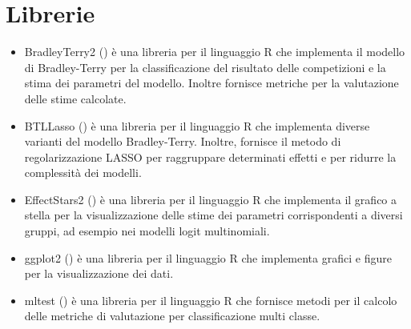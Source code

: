 \section{Librerie}\label{cap:importR}
\begin{itemize}
	\item\textsf{BradleyTerry2} (\textit{\cite{bt2}}) è una libreria per il linguaggio R che implementa il modello di Bradley-Terry per la classificazione del risultato delle competizioni e la stima dei parametri del modello. Inoltre fornisce metriche per la valutazione delle stime calcolate.
	\item\textsf{BTLLasso} (\textit{\cite{btl}}) è una libreria per il linguaggio R che implementa diverse varianti del modello Bradley-Terry. Inoltre, fornisce il metodo di regolarizzazione LASSO per raggruppare determinati effetti e per ridurre la complessità dei modelli.
	\item\textsf{EffectStars2} (\textit{\cite{EffectStars2}}) è una libreria per il linguaggio R che implementa il grafico a stella per la visualizzazione delle stime dei parametri corrispondenti a diversi gruppi, ad esempio nei modelli logit multinomiali.
	\item\textsf{ggplot2} (\textit{\cite{ggplot2}}) è una libreria per il linguaggio R che implementa grafici e figure per la visualizzazione dei dati.
	\item\textsf{mltest} (\textit{\cite{mltest}}) è una libreria per il linguaggio R che fornisce metodi per il calcolo delle metriche di valutazione per classificazione multi classe.
\end{itemize}